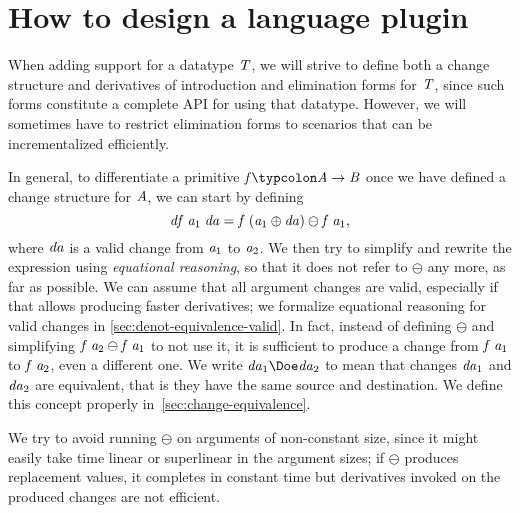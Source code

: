 \section{How to design a language plugin}
\label{sec:plugin-design}

When adding support for a datatype \ensuremath{\Conid{T}}, we will strive to
define both a change structure and derivatives of introduction and
elimination forms for \ensuremath{\Conid{T}}, since such forms constitute a complete API
for using that datatype. However, we will sometimes have to restrict
elimination forms to scenarios that can be incrementalized efficiently.

In general, to differentiate a primitive \ensuremath{\Varid{f}\typcolon\Conid{A}\to \Conid{B}} once we have defined a
change structure for \ensuremath{\Conid{A}}, we can start by defining
\begin{equation}
  \label{eq:diff-primitive-eq-reasoning}
  \mathit{df}\;\mathit{a}_{1}\;\mathit{da}\mathrel{=}\mathit{f}\;(\mathit{a}_{1}\oplus \mathit{da})\ominus \mathit{f}\;\mathit{a}_{1},
\end{equation}
where \ensuremath{\Varid{da}} is a valid change from \ensuremath{\Varid{a}_{1}} to \ensuremath{\Varid{a}_{2}}. We then try to
simplify and rewrite the expression using \emph{equational reasoning}, so that it does
not refer to \ensuremath{\ominus } any more, as far as possible. We can assume that all
argument changes are valid, especially if that allows producing faster
derivatives; we formalize equational reasoning for valid changes in
\cref{sec:denot-equivalence-valid}.
In fact, instead of defining \ensuremath{\ominus } and simplifying \ensuremath{\Varid{f}\;\Varid{a}_{2}\ominus \Varid{f}\;\Varid{a}_{1}} to
not use it, it is sufficient to produce a change from \ensuremath{\Varid{f}\;\Varid{a}_{1}} to \ensuremath{\Varid{f}\;\Varid{a}_{2}}, even a
different one. We write \ensuremath{\Varid{da}_{1}\Doe\Varid{da}_{2}} to mean that changes \ensuremath{\Varid{da}_{1}} and \ensuremath{\Varid{da}_{2}} are
equivalent, that is they have the same source and destination. We define this
concept properly in~\cref{sec:change-equivalence}.

We try to avoid running \ensuremath{\ominus } on arguments of non-constant size, since it
might easily take time linear or superlinear in the argument sizes; if
\ensuremath{\ominus } produces replacement values, it completes in constant time but
derivatives invoked on the produced changes are not efficient.

